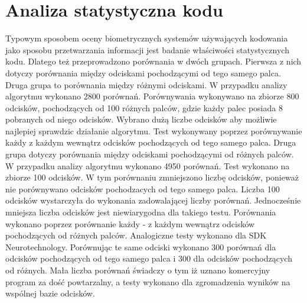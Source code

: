 \section[Analiza statystyczna kodu][Analiza statystyczna kodu]{Analiza statystyczna kodu} 
Typowym sposobem oceny biometrycznych systemów używających kodowania jako sposobu przetwarzania informacji jest badanie właściwości statystycznych kodu. Dlatego też przeprowadzono porównania w dwóch grupach. Pierwsza z nich dotyczy porównania między odciskami pochodzącymi od tego samego palca. Druga grupa to porównania między różnymi odciskami. W przypadku analizy algorytmu wykonano 2800 porównań. Porównywania wykonywano na zbiorze 800 odcisków, pochodzących od 100 różnych palców, gdzie każdy palec posiada 8 pobranych od niego odcisków. Wybrano dużą liczbe odcisków aby możliwie najlepiej sprawdzic działanie algorytmu. Test wykonywany poprzez porównywanie każdy z każdym wewnątrz odcisków pochodzących od tego samego palca. Druga grupa dotyczy porównania między odciskami pochodzącymi od różnych palców. W przypadku analizy algorytmu wykonano 4950 porównań. Test wykonano na zbiorze 100 odcisków. W tym porównaniu zmniejszono liczbę odcisków, ponieważ nie porównywano odcisków pochodzacych od tego samego palca. Liczba 100 odcisków wystarczyła do wykonania zadowalającej liczby porównań. Jednocześnie mniejsza liczba odcisków jest niewiarygodna dla takiego testu. Porównania wykonano poprzez porównanie każdy - z każdym wewnątrz odcisków pochodzących od różnych palców. Analogiczne testy wykonano dla SDK Neurotechnology. Porównując te same odciski wykonano 300 porównań dla odcisków pochodzących od tego samego palca i 300 dla odcisków pochodzących od różnych. Mała liczba porównań świadczy o tym iż uznano komercyjny program za dość powtarzalny, a testy wykonano dla zgromadzenia wyników na wspólnej bazie odcisków.
